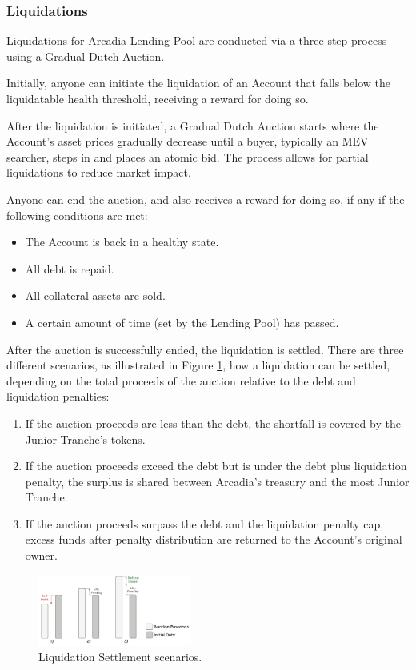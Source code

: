 \documentclass[sigconf,nonacm]{acmart}
\begin{document}
\subsubsection{Liquidations}
\label{subsubsec:liquidations}
Liquidations for Arcadia Lending Pool are conducted via a three-step process using a Gradual Dutch Auction.

Initially, anyone can initiate the liquidation of an Account that falls below the liquidatable health threshold,
receiving a reward for doing so.

After the liquidation is initiated, a Gradual Dutch Auction starts where the Account's asset prices gradually decrease until a buyer,
typically an MEV searcher, steps in and places an atomic bid.
The process allows for partial liquidations to reduce market impact.

Anyone can end the auction, and also receives a reward for doing so, if any if the following conditions are met:
\begin{itemize}
    \item The Account is back in a healthy state.
    \item All debt is repaid.
    \item All collateral assets are sold.
    \item A certain amount of time (set by the Lending Pool) has passed.
\end{itemize}

After the auction is successfully ended, the liquidation is settled.
There are three different scenarios, as illustrated in Figure \ref{fig:liquidation-settlement}, how a liquidation can be settled,
depending on the total proceeds of the auction relative to the debt and liquidation penalties:
\begin{enumerate}
    \item If the auction proceeds are less than the debt,
    the shortfall is covered by the Junior Tranche's tokens.
    \item If the auction proceeds exceed the debt but is under the debt plus liquidation penalty,
    the surplus is shared between Arcadia's treasury and the most Junior Tranche.
    \item If the auction proceeds surpass the debt and the liquidation penalty cap,
    excess funds after penalty distribution are returned to the Account's original owner.
\end{enumerate}

\begin{figure}
    \centering
    \includegraphics[width=0.45\textwidth]{images/Liquidation-Settlement.png}
    \caption{Liquidation Settlement scenarios. \label{fig:liquidation-settlement}}
\end{figure}
\end{document}
